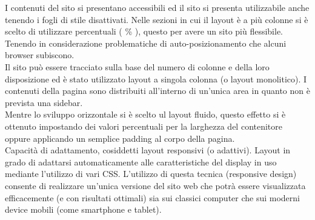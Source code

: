 {	I contenuti del sito si presentano accessibili ed il sito si presenta utilizzabile anche tenendo i fogli di stile disattivati.
	Nelle sezioni in cui il layout è a più colonne si è scelto di utilizzare percentuali ( \% ), questo per avere un sito più flessibile. Tenendo in considerazione problematiche di auto-posizionamento che alcuni browser subiscono.\\
	Il sito può essere tracciato sulla base del numero di colonne e della loro disposizione ed è stato utilizzato layout a singola colonna (o layout monolitico). I contenuti della pagina sono distribuiti all'interno di un'unica area in quanto non è prevista una sidebar.\\
	Mentre lo sviluppo orizzontale si è scelto ul layout fluido, questo effetto si è ottenuto impostando dei valori percentuali per la larghezza del contenitore oppure applicando un semplice padding al corpo della pagina.\\
	Capacità di adattamento, cosiddetti layout responsivi (o adattivi). Layout in grado di adattarsi automaticamente alle caratteristiche del display in uso mediante l'utilizzo di vari CSS. L'utilizzo di questa tecnica (responsive design) consente di realizzare un'unica versione del sito web che potrà essere visualizzata efficacemente (e con risultati ottimali) sia sui classici computer che sui moderni device mobili (come smartphone e tablet).
}
